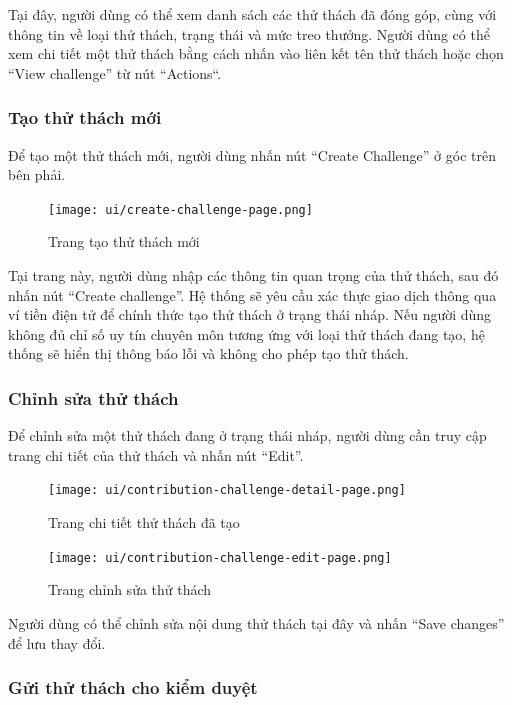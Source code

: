 Tại đây, người dùng có thể xem danh sách các thử thách đã đóng góp, cùng với thông tin về loại thử thách, trạng thái và mức treo thưởng.  
Người dùng có thể xem chi tiết một thử thách bằng cách nhấn vào liên kết tên thử thách hoặc chọn ``View challenge'' từ nút ``Actions``.

\subsubsection{Tạo thử thách mới}

Để tạo một thử thách mới, người dùng nhấn nút ``Create Challenge'' ở góc trên bên phải.

\begin{figure}[H]
  \centering
  \texttt{[image: ui/create-challenge-page.png]}
  \caption{Trang tạo thử thách mới}
  \label{fig:create-challenge-page}
\end{figure}

Tại trang này, người dùng nhập các thông tin quan trọng của thử thách, sau đó nhấn nút ``Create challenge''.  
Hệ thống sẽ yêu cầu xác thực giao dịch thông qua ví tiền điện tử để chính thức tạo thử thách ở trạng thái nháp.
Nếu người dùng không đủ chỉ số uy tín chuyên môn tương ứng với loại thử thách đang tạo, hệ thống sẽ hiển thị thông báo lỗi và không cho phép tạo thử thách.

\subsubsection{Chỉnh sửa thử thách}

Để chỉnh sửa một thử thách đang ở trạng thái nháp, người dùng cần truy cập trang chi tiết của thử thách và nhấn nút ``Edit''.

\begin{figure}[H]
  \centering
  \texttt{[image: ui/contribution-challenge-detail-page.png]}
  \caption{Trang chi tiết thử thách đã tạo}
  \label{fig:contribution-challenge-detail-page}
\end{figure}

\begin{figure}[H]
  \centering
  \texttt{[image: ui/contribution-challenge-edit-page.png]}
  \caption{Trang chỉnh sửa thử thách}
  \label{fig:contribution-challenge-edit-page}
\end{figure}

Người dùng có thể chỉnh sửa nội dung thử thách tại đây và nhấn ``Save changes'' để lưu thay đổi.

\subsubsection{Gửi thử thách cho kiểm duyệt}

